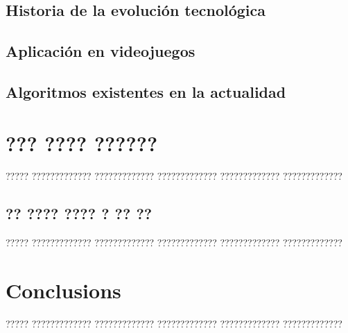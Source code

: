 \documentclass[11pt,spanish,listoffigures,listoftables]{tfgetsinf}
\begin{document}
\section{Historia de la evolución tecnológica}

\section{Aplicación en videojuegos}



\section{Algoritmos existentes en la actualidad}



\chapter{??? ???? ??????}

????? ????????????? ????????????? ????????????? ????????????? ????????????? 

\section{?? ???? ???? ? ?? ??}

????? ????????????? ????????????? ????????????? ????????????? ?????????????


\chapter{Conclusions}

????? ????????????? ????????????? ????????????? ????????????? ????????????? 

\end{document}
